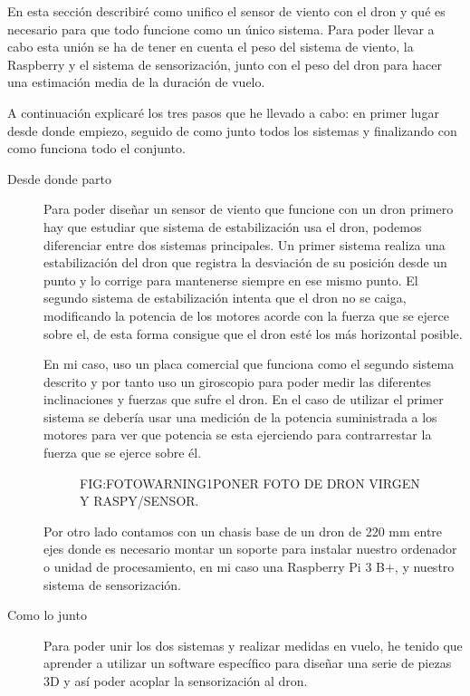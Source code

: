 
En esta sección describiré como unifico el sensor de viento con el dron y qué es necesario para que todo funcione como un único sistema.
Para poder llevar a cabo esta unión se ha de tener en cuenta el peso del sistema de viento, la Raspberry y el sistema de sensorización, junto con el peso del dron para hacer una estimación media de la duración de vuelo.

A continuación explicaré los tres pasos que he llevado a cabo: en primer lugar desde donde empiezo, seguido de como junto todos los sistemas y finalizando con como funciona todo el conjunto.

\begin{description}
\item[Desde donde parto]
Para poder diseñar un sensor de viento que funcione con un dron primero hay que estudiar que sistema de estabilización usa el dron, podemos diferenciar entre dos sistemas principales. Un primer sistema realiza una estabilización del dron que registra la desviación de su posición desde un punto y lo corrige para mantenerse siempre en ese mismo punto. El segundo sistema de estabilización intenta que el dron no se caiga, modificando la potencia de los motores acorde con la fuerza que se ejerce sobre el, de esta forma consigue que el dron esté los más horizontal posible.

En mi caso, uso un placa comercial que funciona como el segundo sistema descrito y por tanto uso un giroscopio para poder medir las diferentes inclinaciones y fuerzas que sufre el dron. En el caso de utilizar el primer sistema se debería usar una medición de la potencia suministrada a los motores para ver que potencia se esta ejerciendo para contrarrestar la fuerza que se ejerce sobre él.

  \begin{figure}[Dron con y sin piezas añadidas]{FIG:FOTOWARNING1}{PONER FOTO DE DRON VIRGEN Y RASPY/SENSOR.}
\end{figure}

Por otro lado contamos con un chasis base de un dron de 220 mm entre ejes donde es necesario montar un soporte para instalar nuestro ordenador o unidad de procesamiento, en mi caso una Raspberry Pi 3 B+, y nuestro sistema de sensorización.

\item[Como lo junto]
Para poder unir los dos sistemas y realizar medidas en vuelo, he tenido que aprender a utilizar un software específico para diseñar una serie de piezas 3D y así poder acoplar la sensorización al dron.


\end{description}

